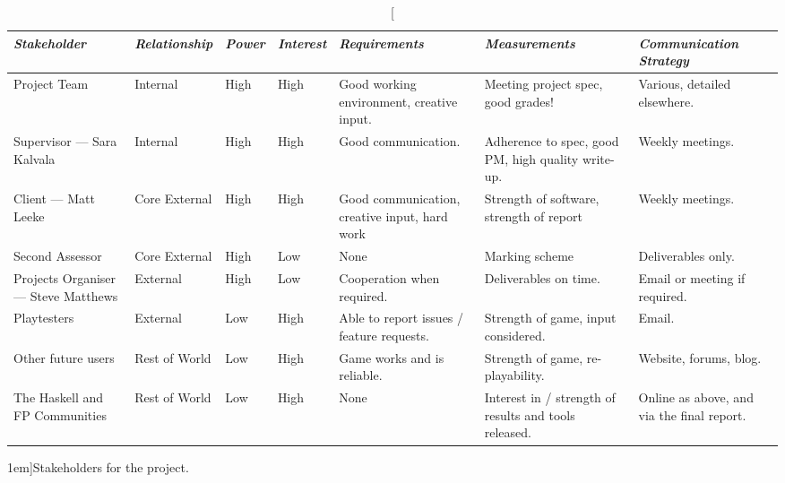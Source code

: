 \begin{table}[t]
	\footnotesize
	\renewcommand{\arraystretch}{1.5}
	\begin{tabular}{p{9em} p{5em} p{3em} p{3em} p{9em} p{9em} p{9em}}
		\toprule
		\emph{Stakeholder} & \emph{Relationship} & \emph{Power} & \emph{Interest} & \emph{Requirements} & \emph{Measurements} & \emph{Communication Strategy} \\
		\midrule
		
		Project Team & Internal & High & High & 
		Good working environment, creative input. & 
		Meeting project spec, good grades! & 
		Various, detailed elsewhere. \\
		
		Supervisor --- Sara Kalvala & Internal & High & High & 
		Good communication. & 
		Adherence to spec, good PM, high quality write-up. & 
		Weekly meetings. \\
		
		Client --- Matt Leeke & Core \mbox{External} & High & High & 
		Good communication, creative input, hard work & 
		Strength of software, strength of report & 
		Weekly meetings. \\
		
		Second Assessor & Core \mbox{External} & High & Low & 
		None & 
		Marking scheme & 
		Deliverables only. \\
		
		Projects Organiser --- Steve Matthews & External & High & Low & 
		Cooperation when required. & 
		Deliverables on time. & 
		Email or meeting if required. \\
		
		Playtesters & External & Low & High & 
		Able to report issues / feature requests. & 
		Strength of game, input considered. & 
		Email. \\
		
		Other future users & Rest of World & Low & High & 
		Game works and is reliable. & 
		Strength of game, re-playability. & 
		Website, forums, blog. \\
		
		The Haskell and FP Communities & Rest of World & Low & High & 
		None & 
		Interest in  / strength of results and tools released. & 
		Online as above, and via the final report. \\
		\bottomrule
	\end{tabular}
	\vspace{1.5em}
	\caption[][1em]{Stakeholders for the project.}
	\label{tab:stakeholders}
\end{table}

